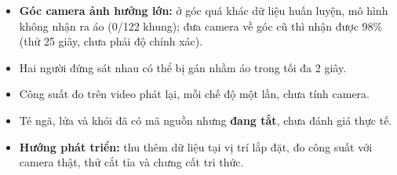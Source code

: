 \documentclass[24pt]{extarticle}
\begin{document}
\begin{minipage}[t]{0.385\textwidth}
\vspace{0pt}
\begin{tcolorbox}[sec,colframe=wrn!80!black,colbacktitle=wrn!80!black,coltitle=black,title={7. Giới hạn và hướng phát triển}]
\begin{itemize}
  \item \textbf{Góc camera ảnh hưởng lớn:} ở góc quá khác dữ liệu huấn luyện, mô hình không nhận ra áo (0/122 khung); đưa camera về góc cũ thì nhận được 98\% (thử 25 giây, chưa phải độ chính xác).
  \item Hai người đứng sát nhau có thể bị gán nhầm áo trong tối đa 2 giây.
  \item Công suất đo trên video phát lại, mỗi chế độ một lần, chưa tính camera.
  \item Té ngã, lửa và khói đã có mã nguồn nhưng \textbf{đang tắt}, chưa đánh giá thực tế.
  \item \textbf{Hướng phát triển:} thu thêm dữ liệu tại vị trí lắp đặt, đo công suất với camera thật, thử cắt tỉa và chưng cất tri thức.
\end{itemize}
\end{tcolorbox}
\end{minipage}
\end{document}
